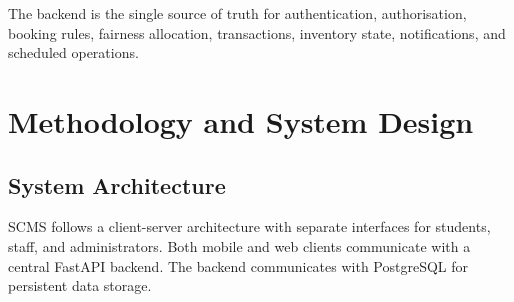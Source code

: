 \documentclass[12pt,a4paper,oneside]{report}
\begin{document}
The backend is the single source of truth for authentication, authorisation, booking rules, fairness allocation, transactions, inventory state, notifications, and scheduled operations.

\chapter{Methodology and System Design}

\section{System Architecture}

SCMS follows a client-server architecture with separate interfaces for students, staff, and administrators. Both mobile and web clients communicate with a central FastAPI backend. The backend communicates with PostgreSQL for persistent data storage.
\end{document}
